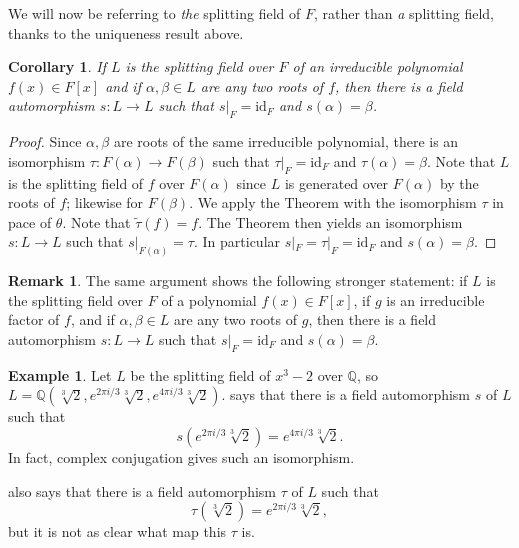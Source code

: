 \documentclass[12pt]{report}
\newtheorem{corollary}[theorem]{Corollary}
\numberwithin{equation}{section}
\numberwithin{theorem}{chapter}
\theoremstyle{definition}
\newtheorem{example}[theorem]{Example}
\newtheorem*{basic properties}{Basic Properties}
\newtheorem*{Important Remark}{Important Remark}
\newtheorem{remark}[theorem]{Remark}
\begin{document}
We will now be referring to \emph{the} splitting field of $F$, rather than \emph{a} splitting field, thanks to the uniqueness result above.


\begin{corollary}\label{por418}
If $L$ is the splitting field over $F$ of an irreducible polynomial $f(x) \in F[x]$ and if $\alpha, \beta \in L$ are any two roots of $f$, then there is a field automorphism $s\!: L \to L$ such that $s|_F = \mathrm{id}_F$ and $s(\alpha) = \beta$.
\end{corollary}

\begin{proof} 
Since $\alpha, \beta$ are roots of the same irreducible polynomial, there is an isomorphism $\tau: F(\alpha) \to F(\beta)$ such that $\tau|_F = \mathrm{id}_F$ and $\tau(\alpha) = \beta$. Note that $L$ is the splitting field of $f$ over $F(\alpha)$ since $L$ is generated over $F(\alpha)$ by the roots of $f$; likewise for $F(\beta)$. We apply the Theorem with the isomorphism $\tau$ in pace of $\theta$. Note that $\tilde\tau(f)=f$. The Theorem then yields an isomorphism $s\!:L\to L$ such that $s|_{F(\alpha)} = \tau$. In particular $s|_F=\tau|_F = \mathrm{id}_F$ and $s(\alpha)=\beta$.
\end{proof}

\begin{remark} The same argument shows the following stronger statement: if $L$ is the splitting field over $F$ of a polynomial $f(x) \in F[x]$, if $g$ is an irreducible factor of $f$, and if $\alpha, \beta \in L$ are any two roots of $g$, then there is a field automorphism $s\!: L \to L$ such that $s|_F = \mathrm{id}_F$ and $s(\alpha) = \beta$.
\end{remark}





\begin{example} 
Let $L$ be the splitting field of $x^3 - 2$ over $\mathbb{Q}$, so $L = \mathbb{Q}(\sqrt[3]{2}, e^{2 \pi i/3}\sqrt[3]{2}, e^{4 \pi i/3}\sqrt[3]{2})$.
 says that there is a field automorphism $s$ of $L$ such that 
$$s(e^{2 \pi i/3}\sqrt[3]{2}) = e^{4 \pi i/3}\sqrt[3]{2}.$$
In fact, complex conjugation gives such an isomorphism.

 also says that there is a field automorphism $\tau$ of $L$ such that 
$$\tau(\sqrt[3]{2}) = e^{2 \pi i/3}\sqrt[3]{2},$$ 
but it is not as clear what map this $\tau$ is.
\end{example}
\end{document}
